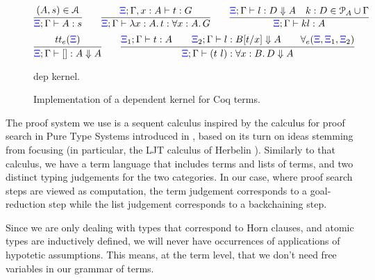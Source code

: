 \begin{footnotesize}
\begin{figure}
    \newcommand{\XXi}{{\color{blue}{\Xi}}}

  \newcommand{\bc}[5]{#1;#2\vdash #3 : #4 \Downarrow #5}
\[
\infer{\XXi;\Gamma\vdash A : s}
{(A,s) \in \mathcal{A}
}
\qquad
\infer{\XXi;\Gamma\vdash \lambda x:A.\,t : \forall x : A.\,  G}
{\XXi;\Gamma, x : A\vdash t : G%
}
\qquad
\infer{\XXi;\Gamma\vdash k l : A}
      {\bc{\XXi}{\Gamma} l D A \quad k : D \in \Pscr_A\cup\Gamma}
\]
\vskip -18pt
\[
  \infer{\bc {\XXi}{\Gamma} {[]} A A}{\trueExpert{\XXi}}{}\qquad
  \infer{\bc{\XXi}{\Gamma}{(t\ l)} {\forall x:B.\, D} A}
  {\XXi_1;\Gamma\vdash t : A\qquad \bc{\XXi_2}{\Gamma}l {B[t/x]} A\qquad\prodExpert{\XXi}{\XXi_1}{\XXi_2}}{}
\]
%
\caption{dep kernel.}
\label{fig:augmented}
\end{figure}
\begin{figure}
%

\caption{Implementation of a  dependent kernel for Coq terms.}
\label{fig:kernel}
\end{figure}
\end{footnotesize}

The proof system we use is a sequent calculus inspired by the calculus for
proof search in Pure Type Systems introduced in \cite{LengrandDM06}, based on
its turn on ideas stemming from focusing (in particular, the LJT calculus of
Herbelin \cite{Herbelin94}). Similarly to that calculus, we have a term
language that includes terms and lists of terms, and two distinct typing
judgements for the two categories. In our case, where proof search steps are
viewed as computation, the term judgement corresponds to a goal-reduction
step while the list judgement corresponds to a backchaining step.

Since we are only dealing with types that correspond to Horn clauses, and
atomic types are inductively defined, we will never have occurrences of
applications of hypotetic assumptions. This means, at the term level, that
we don't need free variables in our grammar of terms. 


